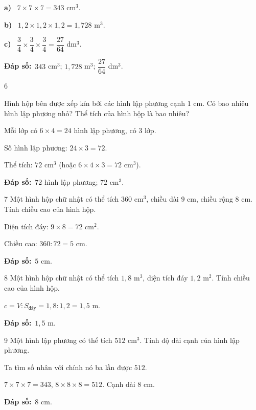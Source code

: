\documentclass[11pt]{article}
\newif\ifsol \solfalse
\providecommand{\AnsWord}{Đáp số}
\newcommand{\dapso}[1]{\par\textbf{\AnsWord:}\ #1}
\newcommand{\probsol}[1]{%
  \begin{lrbox}{\solmeasure}\begin{minipage}{\dimexpr\linewidth-24pt\relax}#1\end{minipage}\end{lrbox}%
  \ifsol
    \begin{solbox}#1\end{solbox}%
  \else
    \setlength{\solht}{\dimexpr\ht\solmeasure+\dp\solmeasure+0.85cm\relax}%
    \ifdim\solht<1.35cm\setlength{\solht}{1.35cm}\fi
    \begin{tcolorbox}[colback=white,colframe=Line,boxrule=0.8pt,arc=5pt,
      left=8pt,right=8pt,top=4pt,bottom=4pt,height=\solht]{\footnotesize\color{Slate}\itshape\WorkWord}\end{tcolorbox}%
  \fi}
\newcommand{\pa}[1]{\textbf{#1)}\ }
\newcommand{\gap}{\vspace{0.3cm}}
\def\WorkWord{Bài làm:}
\def\AnsWord{Đáp số}
\begin{document}
\probsol{
\pa{a} $7\times7\times7=343$ cm$^3$.\par
\pa{b} $1{,}2\times1{,}2\times1{,}2=1{,}728$ m$^3$.\par
\pa{c} $\dfrac34\times\dfrac34\times\dfrac34=\dfrac{27}{64}$ dm$^3$.
\dapso{$343$ cm$^3$; $1{,}728$ m$^3$; $\dfrac{27}{64}$ dm$^3$.}}
\gap
\begin{probbox}{6}{\relax}
\begin{minipage}[t]{0.58\linewidth}
Hình hộp bên được xếp kín bởi các hình lập phương cạnh $1$ cm. Có bao nhiêu hình lập phương nhỏ? Thể tích của hình hộp là bao nhiêu?
\end{minipage}\hfill
\begin{minipage}[t]{0.38\linewidth}\vspace{0pt}\centering
{}
\end{minipage}
\end{probbox}
\probsol{
Mỗi lớp có $6\times4=24$ hình lập phương, có $3$ lớp.\par
Số hình lập phương: $24\times3=72$.\par
Thể tích: $72$ cm$^3$ (hoặc $6\times4\times3=72$ cm$^3$).
\dapso{$72$ hình lập phương; $72$ cm$^3$.}}
\gap
\begin{probbox}{7}{\relax}
Một hình hộp chữ nhật có thể tích $360$ cm$^3$, chiều dài $9$ cm, chiều rộng $8$ cm. Tính chiều cao của hình hộp.
\end{probbox}
\probsol{
Diện tích đáy: $9\times8=72$ cm$^2$.\par
Chiều cao: $360:72=5$ cm.
\dapso{$5$ cm.}}
\gap
\begin{probbox}{8}{\relax}
Một hình hộp chữ nhật có thể tích $1{,}8$ m$^3$, diện tích đáy $1{,}2$ m$^2$. Tính chiều cao của hình hộp.
\end{probbox}
\probsol{
$c=V:S_{\text{đáy}}=1{,}8:1{,}2=1{,}5$ m.
\dapso{$1{,}5$ m.}}
\gap
\begin{probbox}{9}{\relax}
Một hình lập phương có thể tích $512$ cm$^3$. Tính độ dài cạnh của hình lập phương.
\end{probbox}
\probsol{
Ta tìm số nhân với chính nó ba lần được $512$.\par
$7\times7\times7=343$, $8\times8\times8=512$. Cạnh dài $8$ cm.
\dapso{$8$ cm.}}
\end{document}
